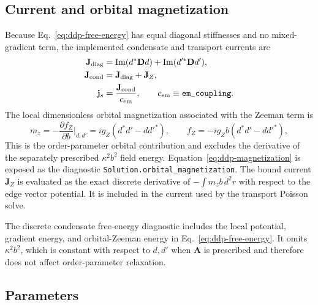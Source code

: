 \documentclass[11pt]{article}
\begin{document}
\subsection{Current and orbital magnetization}

Because Eq.~\eqref{eq:ddp-free-energy} has equal diagonal stiffnesses and no
mixed-gradient term, the implemented condensate and transport currents are
\begin{align}
    \mathbf J_{\rm diag}
      &=\operatorname{Im}(d^*\mathbf Dd)
        +\operatorname{Im}(d'^*\mathbf Dd'),\\
    \mathbf J_{\rm cond}&=\mathbf J_{\rm diag}+\mathbf J_Z,\\
    \mathbf j_s&=\frac{\mathbf J_{\rm cond}}{c_{\rm em}},
    \qquad c_{\rm em}\equiv\texttt{em\_coupling}.
    \label{eq:ddp-current}
\end{align}
The local dimensionless orbital magnetization associated with the Zeeman term
is
\begin{equation}
    m_z=-\frac{\partial f_Z}{\partial b}\bigg|_{d,d'}
       =i g_Z\left(d^*d'-d d'^*\right),
    \qquad f_Z=-i g_Zb\left(d^*d'-d d'^*\right),
    \label{eq:ddp-magnetization}
\end{equation}
This is the order-parameter orbital contribution and excludes the derivative
of the separately prescribed $\kappa^2b^2$ field energy.
Equation~\eqref{eq:ddp-magnetization} is exposed as the diagnostic
\texttt{Solution.\allowbreak orbital\_\allowbreak magnetization}.
The bound current $\mathbf J_Z$ is evaluated as the exact discrete derivative
of $-\int m_zb\,d^2r$ with respect to the edge vector potential.  It is included
in the current used by the transport Poisson solve.

The discrete condensate free-energy diagnostic includes the local potential,
gradient energy, and orbital-Zeeman energy in
Eq.~\eqref{eq:ddp-free-energy}.  It omits $\kappa^2b^2$, which is constant with
respect to $d,d'$ when $\mathbf A$ is prescribed and therefore does not affect
order-parameter relaxation.

\subsection{Parameters}
\end{document}
